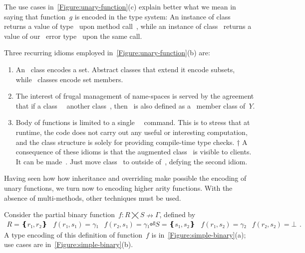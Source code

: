 The use cases in~\cref{Figure:unary-function}(c) explain better
  what we mean in saying that function~$g$ is encoded in the type system:
  An instance of class~ returns a value of type~ upon
  method call~, while
  an instance of class~ returns a value of our~
  error type~ upon the same call.

Three recurring idioms employed in~\cref{Figure:unary-function}(b) are:
\begin{enumerate}
  \item An~ class encodes a set.
    Abstract classes that extend it encode
      subsets, while~ classes encode set members.
  \item The interest of frugal management of name-spaces is served
    by the agreement that if a class~~ another class~, then~ is also defined
    as a~ member class of~$Y$.
  \item Body of functions is limited to a single~~\cc{;} command.
      This is to stress that at runtime, the code does not carry out any useful or interesting computation,
      and the class structure is solely for providing compile-time type checks.
†{%
A consequence of these idioms is that the augmented class~ is visible to clients.
It can be made~. Just move class~ to outside of~, defying the second idiom.
}
\end{enumerate}

Having seen how how inheritance and overriding make possible
  the encoding of unary functions, we turn now to encoding higher arity functions.
With the absence of multi-methods, other techniques must be used.

Consider the partial binary function~$f: R⨉S↛Γ$, defined by
\begin{equation}
  \label{Equation:simple-binary}
  \begin{array}{ccc}
    R=❴r₁,r₂❵ & f(r₁,s₁)=γ₁ & f(r₂,s₁)=γ₁⏎
    S=❴s₁,s₂❵ & f(r₁,s₂)=γ₂ & f(r₂, s₂)=⊥
  \end{array}.
\end{equation}
A \Java type encoding of this definition of function~$f$
  is in~\cref{Figure:simple-binary}(a); use cases
    are in~\cref{Figure:simple-binary}(b).


